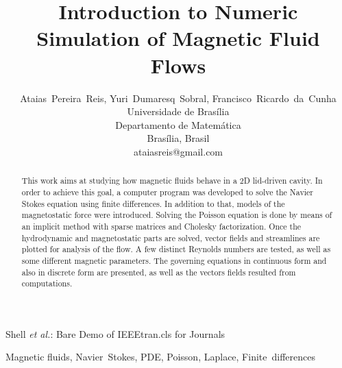 \documentclass[journal]{IEEEtran}
\begin{document}
\title{Introduction to Numeric Simulation of Magnetic Fluid Flows}

\author{Ataias~Pereira~Reis, Yuri~Dumaresq~Sobral, Francisco~Ricardo~da~Cunha\\Universidade de Brasília\\Departamento de Matemática\\Brasília, Brasil\\ataiasreis@gmail.com}

%
{Shell \MakeLowercase{\textit{et al.}}: Bare Demo of IEEEtran.cls for Journals}

\maketitle


\begin{abstract}
This work aims at studying how magnetic fluids behave in a 2D lid-driven cavity. In order to achieve this goal, a computer program was developed to solve the Navier Stokes equation using finite differences. In addition to that, models of the magnetostatic force were introduced. Solving the Poisson equation is done by means of an implicit method with sparse matrices and Cholesky factorization. Once the hydrodynamic and magnetostatic parts are solved, vector fields and streamlines are plotted for analysis of the flow. A few distinct Reynolds numbers are tested, as well as some different magnetic parameters. The governing equations in continuous form and also in discrete form are presented, as well as the vectors fields resulted from computations.
\end{abstract}

\begin{IEEEkeywords}
Magnetic fluids, Navier~Stokes, PDE, Poisson, Laplace, Finite~differences
\end{IEEEkeywords}

%
\IEEEpeerreviewmaketitle
\end{document}
